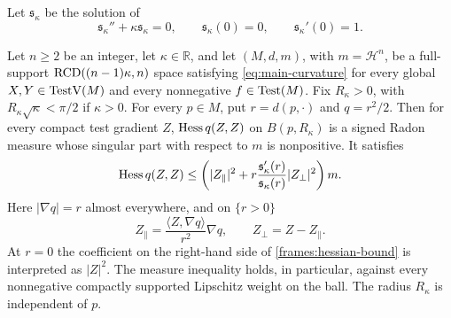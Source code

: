 Let $\mathfrak s_\kappa$ be the solution of
\[
 \mathfrak s_\kappa''+\kappa\mathfrak s_\kappa=0,
 \qquad \mathfrak s_\kappa(0)=0,
 \qquad \mathfrak s_\kappa'(0)=1.
\]

\begin{theorem}
 \label{frames:hessian}
 Let \(n\ge2\) be an integer, let \(\kappa\in\mathbb R\), and let
 \((M,d,m)\), with \(m=\mathcal H^n\), be a full-support
 \(\mathrm{RCD}((n-1)\kappa,n)\) space satisfying
 \eqref{eq:main-curvature} for every global \(X,Y\in\operatorname{TestV}(M)\)
 and every nonnegative \(f\in\operatorname{Test}(M)\).
 Fix \(R_\kappa>0\), with \(R_\kappa\sqrt\kappa<\pi/2\) if
 \(\kappa>0\). For every \(p\in M\), put \(r=d(p,\cdot)\)
 and \(q=r^2/2\). Then for every compact test gradient \(Z\),
 $\operatorname{Hess} q(Z,Z)$ on $B(p,R_\kappa)$ is a signed Radon measure
 whose singular part with respect to $m$ is nonpositive.
 It satisfies
 \begin{equation}\label{frames:hessian-bound}
  \operatorname{Hess} q(Z,Z)
    \leq\left(
       |Z_\parallel|^2+
       r\frac{\mathfrak s_\kappa'(r)}{\mathfrak s_\kappa(r)}
                   |Z_\perp|^2\right)m.
 \end{equation}
 Here $|\nabla q|=r$ almost everywhere, and on $\{r>0\}$
 \[
  Z_\parallel=\frac{\langle Z,\nabla q\rangle}{r^2}\nabla q,
             \qquad Z_\perp=Z-Z_\parallel.
 \]
 At $r=0$ the coefficient on the right-hand side of
 \eqref{frames:hessian-bound} is interpreted as $|Z|^2$.
 The measure inequality holds, in particular, against every
 nonnegative compactly supported Lipschitz weight on the ball.
 The radius $R_\kappa$ is independent of $p$.
\end{theorem}

